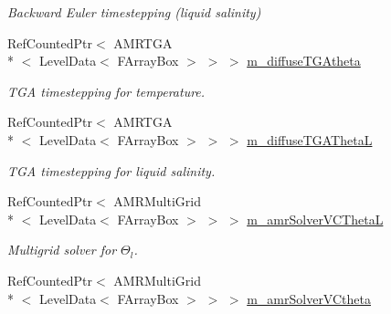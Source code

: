 \begin{DoxyCompactItemize}
\begin{DoxyCompactList}\small\item\em Backward Euler timestepping (liquid salinity) \end{DoxyCompactList}\item 
\hypertarget{classamr_mushy_layer_a49b8b88e6730972a029e2bf6d4182ee7}{Ref\-Counted\-Ptr$<$ A\-M\-R\-T\-G\-A\\*
$<$ Level\-Data$<$ F\-Array\-Box $>$ $>$ $>$ \hyperlink{classamr_mushy_layer_a49b8b88e6730972a029e2bf6d4182ee7}{m\-\_\-diffuse\-T\-G\-Atheta}}\label{classamr_mushy_layer_a49b8b88e6730972a029e2bf6d4182ee7}

\begin{DoxyCompactList}\small\item\em T\-G\-A timestepping for temperature. \end{DoxyCompactList}\item 
\hypertarget{classamr_mushy_layer_a79ad018a6ce1b9d7f35416626460df84}{Ref\-Counted\-Ptr$<$ A\-M\-R\-T\-G\-A\\*
$<$ Level\-Data$<$ F\-Array\-Box $>$ $>$ $>$ \hyperlink{classamr_mushy_layer_a79ad018a6ce1b9d7f35416626460df84}{m\-\_\-diffuse\-T\-G\-A\-Theta\-L}}\label{classamr_mushy_layer_a79ad018a6ce1b9d7f35416626460df84}

\begin{DoxyCompactList}\small\item\em T\-G\-A timestepping for liquid salinity. \end{DoxyCompactList}\item 
\hypertarget{classamr_mushy_layer_a13dd34a374c9127861e59199773db8e6}{Ref\-Counted\-Ptr$<$ A\-M\-R\-Multi\-Grid\\*
$<$ Level\-Data$<$ F\-Array\-Box $>$ $>$ $>$ \hyperlink{classamr_mushy_layer_a13dd34a374c9127861e59199773db8e6}{m\-\_\-amr\-Solver\-V\-C\-Theta\-L}}\label{classamr_mushy_layer_a13dd34a374c9127861e59199773db8e6}

\begin{DoxyCompactList}\small\item\em Multigrid solver for $ \Theta_l $. \end{DoxyCompactList}\item 
\hypertarget{classamr_mushy_layer_a87b32d2b06ea2c925a6ac51ddaf64729}{Ref\-Counted\-Ptr$<$ A\-M\-R\-Multi\-Grid\\*
$<$ Level\-Data$<$ F\-Array\-Box $>$ $>$ $>$ \hyperlink{classamr_mushy_layer_a87b32d2b06ea2c925a6ac51ddaf64729}{m\-\_\-amr\-Solver\-V\-Ctheta}}\label{classamr_mushy_layer_a87b32d2b06ea2c925a6ac51ddaf64729}


\end{DoxyCompactItemize}

